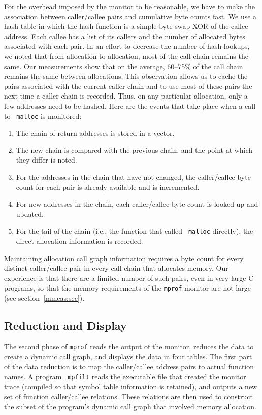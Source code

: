 For the overhead imposed by the monitor to be reasonable, we have to
make the association between caller/callee pairs and cumulative byte
counts fast.  We use a hash table in which the hash function is a
simple byte-swap XOR of the callee address.  Each callee has a list of
its callers and the number of allocated bytes associated with each
pair.  In an effort to decrease the number of hash lookups, we noted
that from allocation to allocation, most of the call chain remains the
same.  Our measurements show that on the average, 60--75\% of the call
chain remains the same between allocations.  This observation allows
us to cache the pairs associated with the current caller chain and to
use most of these pairs the next time a caller chain is recorded.
Thus, on any particular allocation, only a few addresses need to be
hashed.  Here are the events that take place when a call to {\tt
malloc} is monitored:

\begin{enumerate}
  \item The chain of return addresses is stored in a vector.
  \item The new chain is compared with the previous chain, and the point
at which they differ is noted.
  \item For the addresses in the chain that have not changed, the
caller/callee byte count for each pair is already available and is
incremented. 
  \item For new addresses in the chain, each caller/callee byte count is
looked up and updated.
  \item For the tail of the chain (i.e., the function that called {\tt
malloc} directly), the direct allocation information is recorded.
\end{enumerate}

Maintaining allocation call graph information requires a byte count
for every distinct caller/callee pair in every call chain that
allocates memory.  Our experience is that there are a limited number
of such pairs, even in very large C programs, so that the memory
requirements of the {\tt mprof} monitor are not large (see
section~\ref{mmeas:sec}).

\subsection{Reduction and Display}

The second phase of {\tt mprof} reads the output of the monitor,
reduces the data to create a dynamic call graph, and displays the data
in four tables.  The first part of the data reduction is to map the
caller/callee address pairs to actual function names.  A program {\tt
mpfilt} reads the executable file that created the monitor trace
(compiled so that symbol table information is retained), and outputs a
new set of function caller/callee relations.  These relations are then
used to construct the subset of the program's dynamic call graph that
involved memory allocation.

